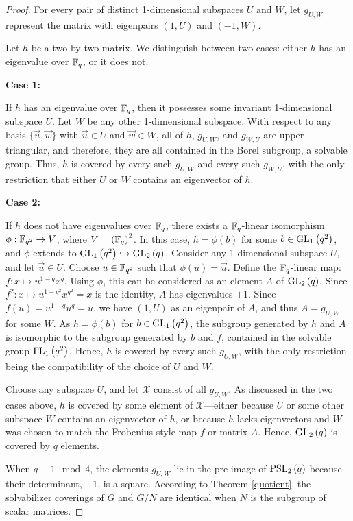 \documentclass{amsart}
\theoremstyle{definition}
\theoremstyle{remark}
\begin{document}
\begin{proof} For every pair of distinct 1-dimensional subspaces $U$ and $W$, let $g_{U,W}$ represent the matrix with eigenpairs $(1,U)$ and $(-1,W)$.

Let $h$ be a two-by-two matrix. We distinguish between two cases: either $h$ has an eigenvalue over $\mathbb{F}_{q}$, or it does not.

    {\bf Case 1:}
    
If $h$ has an eigenvalue over $\mathbb{F}_{q}$, then it possesses some invariant 1-dimensional subspace $U$. Let $W$ be any other 1-dimensional subspace. With respect to any basis $\{\vec{u},\vec{w}\}$ with $\vec{u} \in U$ and $\vec{w} \in W$, all of $h$, $g_{U,W}$, and $g_{W,U}$ are upper triangular, and therefore, they are all contained in the Borel subgroup, a solvable group. Thus, $h$ is covered by every such $g_{U,W}$ and every such $g_{W,U}$, with the only restriction that either $U$ or $W$ contains an eigenvector of $h$.

   
    {\bf Case 2:}

If $h$ does not have eigenvalues over $\mathbb{F}_{q}$, there exists a $\mathbb{F}_{q}$-linear isomorphism $\phi:\mathbb{F}_{q^2} \to V$, where $V=\left(\mathbb{F}_{q}\right)^2$. In this case, $h = \phi(b)$ for some $b \in \operatorname{GL}_{1}\left(q^2\right)$, and $\phi$ extends to $\operatorname{GL}_{1}\left(q^2\right) \hookrightarrow \operatorname{GL}_{2}\left(q\right)$. Consider any 1-dimensional subspace $U$, and let $\vec{u} \in U$. Choose $u \in \mathbb{F}_{q^2}$ such that $\phi(u) = \vec{u}$. Define the $\mathbb{F}_{q}$-linear map: $f: x \mapsto u^{1-q} x^q$. Using $\phi$, this can be considered as an element $A$ of $\operatorname{GL}_{2}\left(q\right)$. Since $f^2 : x \mapsto u^{1-q^2} x^{q^2} = x$ is the identity, $A$ has eigenvalues $\pm1$. Since $f(u) = u^{1-q} u^q = u$, we have $(1,U)$ as an eigenpair of $A$, and thus $A = g_{U,W}$ for some $W$. As $h = \phi(b)$ for $b \in \operatorname{GL}_{1}\left(q^2\right)$, the subgroup generated by $h$ and $A$ is isomorphic to the subgroup generated by $b$ and $f$, contained in the solvable group $\operatorname{\Gamma{}L}_{1}\left(q^2\right)$. Hence, $h$ is covered by every such $g_{U,W}$, with the only restriction being the compatibility of the choice of $U$ and $W$.

Choose any subspace $U$, and let $\mathscr{X}$ consist of all $g_{U,W}$. As discussed in the two cases above, $h$ is covered by some element of $\mathscr{X}$—either because $U$ or some other subspace $W$ contains an eigenvector of $h$, or because $h$ lacks eigenvectors and $W$ was chosen to match the Frobenius-style map $f$ or matrix $A$. Hence, $\operatorname{GL}_{2}\left(q\right)$ is covered by $q$ elements.


When $q \equiv 1 \mod 4$, the elements $g_{U,W}$ lie in the pre-image of $\operatorname{PSL}_{2}\left(q\right)$ because their determinant, $-1$, is a square. According to Theorem \ref{quotient}, the solvabilizer coverings of $G$ and $G/N$ are identical when $N$ is the subgroup of scalar matrices.
\end{proof}
\end{document}
